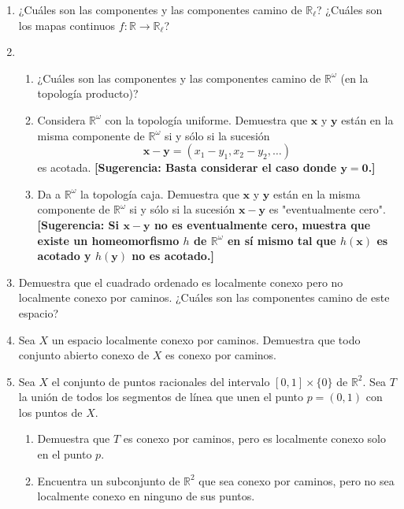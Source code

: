 \documentclass[11pt]{article}
\begin{document}
\begin{enumerate}
    \item ¿Cuáles son las componentes y las componentes camino de $\mathbb{R}_{\ell}$? ¿Cuáles son los mapas continuos $f: \mathbb{R} \to \mathbb{R}_{\ell}$?

    \item 
    \begin{enumerate}
        \item ¿Cuáles son las componentes y las componentes camino de $\mathbb{R}^\omega$ (en la topología producto)?
        \item Considera $\mathbb{R}^\omega$ con la topología uniforme. Demuestra que $\mathbf{x}$ y $\mathbf{y}$ están en la misma componente de $\mathbb{R}^\omega$ si y sólo si la sucesión
        $$
        \mathbf{x} - \mathbf{y} = \left(x_1 - y_1, x_2 - y_2, \ldots \right)
        $$
        es acotada. \textbf{[Sugerencia: Basta considerar el caso donde $\mathbf{y} = \mathbf{0}$.]}
        \item Da a $\mathbb{R}^\omega$ la topología caja. Demuestra que $\mathbf{x}$ y $\mathbf{y}$ están en la misma componente de $\mathbb{R}^\omega$ si y sólo si la sucesión $\mathbf{x} - \mathbf{y}$ es "eventualmente cero". \textbf{[Sugerencia: Si $\mathbf{x} - \mathbf{y}$ no es eventualmente cero, muestra que existe un homeomorfismo $h$ de $\mathbb{R}^\omega$ en sí mismo tal que $h(\mathbf{x})$ es acotado y $h(\mathbf{y})$ no es acotado.]}
    \end{enumerate}

    \item Demuestra que el cuadrado ordenado es localmente conexo pero no localmente conexo por caminos. ¿Cuáles son las componentes camino de este espacio?

    \item Sea $X$ un espacio localmente conexo por caminos. Demuestra que todo conjunto abierto conexo de $X$ es conexo por caminos.

    \item Sea $X$ el conjunto de puntos racionales del intervalo $[0,1] \times \{0\}$ de $\mathbb{R}^2$. Sea $T$ la unión de todos los segmentos de línea que unen el punto $p = (0,1)$ con los puntos de $X$.
    \begin{enumerate}
        \item Demuestra que $T$ es conexo por caminos, pero es localmente conexo solo en el punto $p$.
        \item Encuentra un subconjunto de $\mathbb{R}^2$ que sea conexo por caminos, pero no sea localmente conexo en ninguno de sus puntos.
    \end{enumerate}


\end{enumerate}
\end{document}
